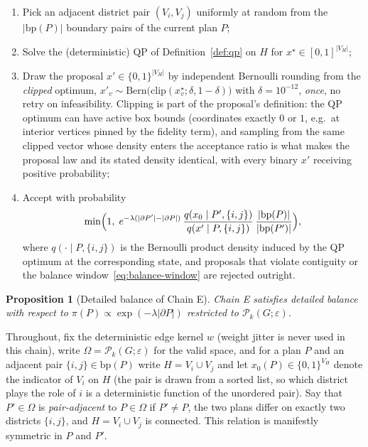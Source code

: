 \documentclass[11pt]{article}
\newtheorem{proposition}{Proposition}[section]
\begin{document}
\begin{enumerate}
  \item Pick an adjacent district pair $(V_i, V_j)$ uniformly at random
    from the $|\mathrm{bp}(P)|$ boundary pairs of the current plan $P$;
  \item Solve the (deterministic) QP of Definition~\ref{def:qp} on
    $H$ for $x^\star \in [0,1]^{|V_H|}$;
  \item Draw the proposal $x' \in \{0,1\}^{|V_H|}$ by independent
    Bernoulli rounding from the \emph{clipped} optimum,
    $x'_v \sim \mathrm{Bern}\bigl(\mathrm{clip}(x^\star_v;
    \delta, 1-\delta)\bigr)$ with $\delta = 10^{-12}$,
    \emph{once}, no retry on infeasibility. Clipping is part of the
    proposal's definition: the QP optimum can have active box bounds
    (coordinates exactly $0$ or $1$, e.g.\ at interior vertices pinned
    by the fidelity term), and sampling from the same clipped vector
    whose density enters the acceptance ratio is what makes the
    proposal law and its stated density identical, with every binary
    $x'$ receiving positive probability;
  \item Accept with probability
    \begin{equation}\label{eq:qpmh-accept}
      \min\Bigl(1,\;
      e^{-\lambda(|\partial P'| - |\partial P|)}\,
      \frac{q(x_0 \mid P', \{i,j\})}{q(x' \mid P, \{i,j\})}\,
      \frac{|\mathrm{bp}(P)|}{|\mathrm{bp}(P')|}\Bigr),
    \end{equation}
    where $q(\cdot \mid P, \{i,j\})$ is the Bernoulli product density
    induced by the QP optimum at the corresponding state, and proposals
    that violate contiguity or the balance
    window~\eqref{eq:balance-window} are rejected outright.
\end{enumerate}

\begin{proposition}[Detailed balance of Chain E]\label{prop:qpmh-db}
Chain E satisfies detailed balance with respect to
$\pi(P) \propto \exp(-\lambda |\partial P|)$ restricted to
$\mathcal{P}_k(G; \varepsilon)$.
\end{proposition}

Throughout, fix the deterministic edge kernel $w$ (weight jitter is
never used in this chain), write $\Omega = \mathcal{P}_k(G;
\varepsilon)$ for the valid space, and for a plan $P$ and an adjacent
pair $\{i,j\} \in \mathrm{bp}(P)$ write $H = V_i \cup V_j$ and let
$x_0(P) \in \{0,1\}^{V_H}$ denote the indicator of $V_i$ on $H$ (the
pair is drawn from a sorted list, so which district plays the role of
$i$ is a deterministic function of the unordered pair). Say that
$P' \in \Omega$ is \emph{pair-adjacent} to $P \in \Omega$ if
$P' \ne P$, the two plans differ on exactly two districts $\{i,j\}$,
and $H = V_i \cup V_j$ is connected. This relation is manifestly
symmetric in $P$ and $P'$.
\end{document}
